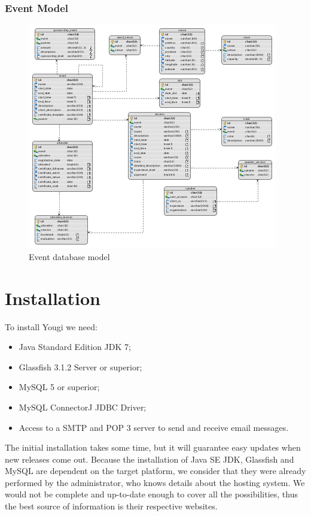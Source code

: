 \documentclass[envcountsame,envcountchap]{svmono}
\begin{document}
\subsection{Event Model}

\begin{figure}
\centering
\includegraphics{figures/event-db-model}
\caption{Event database model}
\label{fig:event-db-model}
\end{figure}

\chapter{Installation}
\label{chp:installation}

To install Yougi we need:

\begin{itemize}
\item Java Standard Edition JDK 7;
\item Glassfish 3.1.2 Server or superior;
\item MySQL 5 or superior;
\item MySQL ConnectorJ JDBC Driver;
\item Access to a SMTP and POP 3 server to send and receive email messages.
\end{itemize}

The initial installation takes some time, but it will guarantee easy updates when new releases come out. Because the installation of Java SE JDK, Glassfish and MySQL are dependent on the target platform, we consider that they were already performed by the administrator, who knows details about the hosting system. We would not be complete and up-to-date enough to cover all the possibilities, thus the best source of information is their respective websites. 
\end{document}
